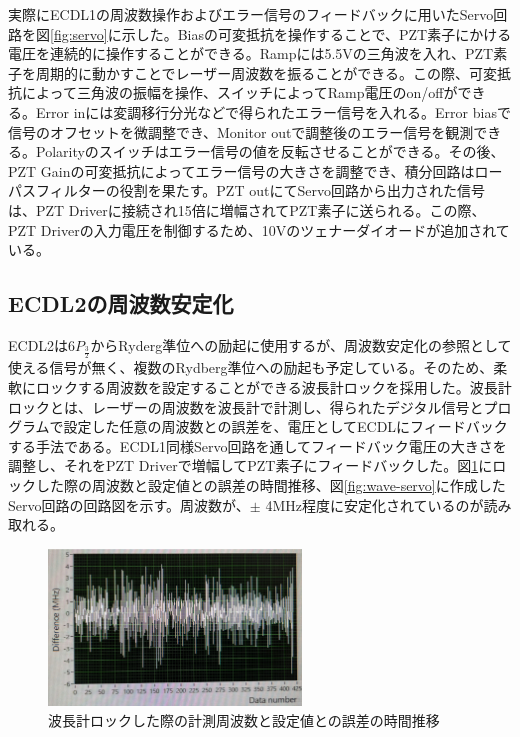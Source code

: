\documentclass[dvipdfmx]{jsarticle}
\begin{document}
実際にECDL1の周波数操作およびエラー信号のフィードバックに用いたServo回路を図\ref{fig:servo}に示した。Biasの可変抵抗を操作することで、PZT素子にかける電圧を連続的に操作することができる。Rampには5.5Vの三角波を入れ、PZT素子を周期的に動かすことでレーザー周波数を振ることができる。この際、可変抵抗によって三角波の振幅を操作、スイッチによってRamp電圧のon/offができる。Error inには変調移行分光などで得られたエラー信号を入れる。Error biasで信号のオフセットを微調整でき、Monitor outで調整後のエラー信号を観測できる。Polarityのスイッチはエラー信号の値を反転させることができる。その後、PZT Gainの可変抵抗によってエラー信号の大きさを調整でき、積分回路はローパスフィルターの役割を果たす。PZT outにてServo回路から出力された信号は、PZT Driverに接続され15倍に増幅されてPZT素子に送られる。この際、PZT Driverの入力電圧を制御するため、10Vのツェナーダイオードが追加されている。


\subsection{ECDL2の周波数安定化}
ECDL2は$6P_\frac{3}{2}$からRyderg準位への励起に使用するが、周波数安定化の参照として使える信号が無く、複数のRydberg準位への励起も予定している。そのため、柔軟にロックする周波数を設定することができる波長計ロックを採用した。波長計ロックとは、レーザーの周波数を波長計で計測し、得られたデジタル信号とプログラムで設定した任意の周波数との誤差を、電圧としてECDLにフィードバックする手法である。ECDL1同様Servo回路を通してフィードバック電圧の大きさを調整し、それをPZT Driverで増幅してPZT素子にフィードバックした。図\ref{fig:wave-lock}にロックした際の周波数と設定値との誤差の時間推移、図\ref{fig:wave-servo}に作成したServo回路の回路図を示す。周波数が、$\pm$ 4MHz程度に安定化されているのが読み取れる。

\begin{figure}
\centering
\includegraphics[width=0.6\textwidth]{images/wave_lock.jpg}
\caption{\label{fig:wave-lock}波長計ロックした際の計測周波数と設定値との誤差の時間推移}
\end{figure}
\end{document}
